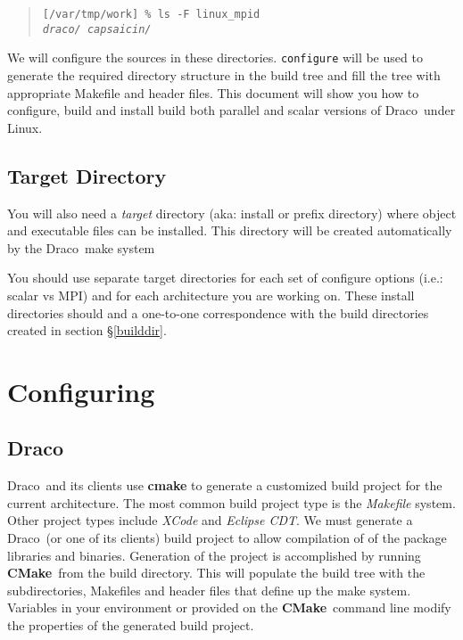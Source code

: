 \documentclass[11pt]{nmemo}
\newcommand{\comp}[1]{\normalfont\footnotesize\texttt{#1}\normalsize}
\newcommand{\draco}{{\normalfont\sffamily Draco}}
\newcommand{\cmake}{{\normalfont\bfseries CMake}}
\begin{document}
\begin{verse}
\texttt{[/var/tmp/work] \% ls -F linux\_mpid \\
\emph{draco/  capsaicin/}}
\end{verse}
\normalsize

We will configure the sources in these directories.  \comp{configure}
will be used to generate the required directory structure in the build
tree and fill the tree with appropriate Makefile and header files.
This document will show you how to configure, build and install build
both parallel and scalar versions of \draco\ under Linux.

\subsection{Target Directory}

You will also need a \emph{target} directory (aka: install or prefix
directory) where object and executable files can be installed.  This
directory will be created automatically by the \draco\ make system

You should use separate target directories for each set of configure
options (i.e.: scalar vs MPI) and for each architecture you are
working on.  These install directories should and a one-to-one
correspondence with the build directories created in section
\S\ref{builddir}.


\section{Configuring}
\label{configure}

\subsection{\draco}

\draco\ and its clients use \textbf{cmake} to generate a customized
build project for the current architecture.  The most common build
project type is the \textit{Makefile} system.  Other project types
include \textit{XCode} and \textit{Eclipse CDT}.  We must generate a
\draco\ (or one of its clients) build project to allow compilation of
of the package libraries and binaries.  Generation of the project is
accomplished by running \cmake\ from the build directory.  This will
populate the build tree with the subdirectories, Makefiles and header
files that define up the make system.  Variables in your environment
or provided on the \cmake\ command line modify the properties of the
generated build project.
\end{document}
